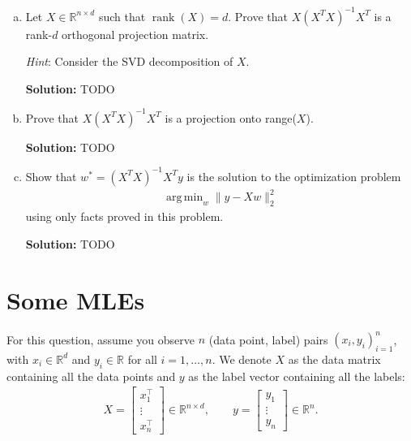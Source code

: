 \documentclass{article}
\newcommand{\Question}[1]{\Large \section{ #1 } \normalsize}
\DeclareMathOperator{\rank}{\mathrm{rank}}
\DeclareMathOperator*{\argmin}{arg\,min}
\newenvironment{solution}{\color{blue} \smallskip \textbf{Solution:}}{}
\begin{document}
\begin{enumerate}[(a)]
    \begin{solution}
        TODO
    \end{solution}

    \newpage
    \item Let $X \in \mathbb{R}^{n \times d}$ such that $\rank(X) = d$. Prove that $X(X^{T}X)^{-1}X^{T}$ is a rank-$d$ orthogonal projection matrix. 
    
    \emph{Hint}: Consider the SVD decomposition of $X$. 
    
    \begin{solution}
        TODO
    \end{solution}

    \newpage
    \item
    Prove that $X(X^{T}X)^{-1}X^{T}$ is a projection onto range($X$).
    
    \begin{solution}
        TODO
    \end{solution}

    \newpage
    \item
    Show that $w^{*} = (X^{T}X)^{-1}X^{T}y$ is the solution to the optimization problem
    \begin{align*}
        \argmin_{w} \|y - Xw\|_{2}^{2}
    \end{align*}
    using only facts proved in this problem.
    
    \begin{solution}
        TODO
    \end{solution}

\end{enumerate}

\newpage
\Question{Some MLEs}
For this question, assume you observe $n$ (data point, label) pairs $(x_i, y_i)_{i=1}^n$, with $x_i\in \mathbb R^d$ and $y_i\in\mathbb R$ for all $i=1,\ldots, n$. We denote $X$ as the data matrix containing all the data points and $y$ as the label vector containing all the labels:
\begin{align*}
    X = \begin{bmatrix} x_1^\top \\\vdots \\ x_n^\top \end{bmatrix} \in \mathbb R^{n\times d}, \qquad y = \begin{bmatrix} y_1 \\ \vdots \\ y_n\end{bmatrix}\in\mathbb R^n.
\end{align*}
\end{document}
